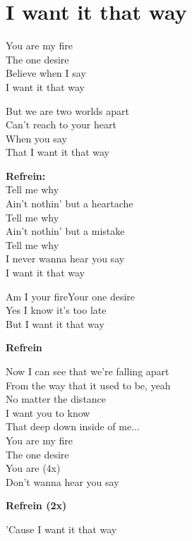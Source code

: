 \section{I want it that way}
You are my fire\\
The one desire\\
Believe when I say\\
I want it that way

But we are two worlds apart\\
Can’t reach to your heart\\
When you say\\
That I want it that way

\textbf{Refrein:}\\
Tell me why\\
Ain’t nothin’ but a heartache\\
Tell me why\\
Ain’t nothin’ but a mistake\\
Tell me why\\
I never wanna hear you say\\
I want it that way

Am I your fireYour one desire\\
Yes I know it’s too late\\
But I want it that way

\textbf{Refrein}

Now I can see that we’re falling apart\\
From the way that it used to be, yeah\\
No matter the distance\\
I want you to know\\
That deep down inside of me...\\
You are my fire\\
The one desire\\
You are (4x)\\
Don’t wanna hear you say

\textbf{Refrein (2x)}

’Cause I want it that way
